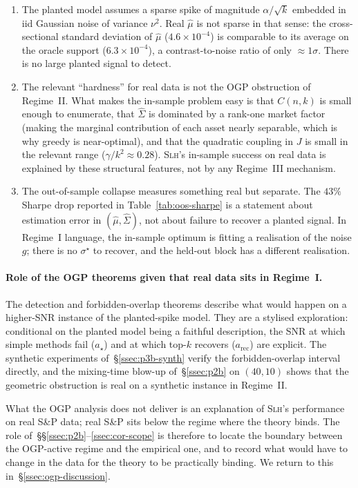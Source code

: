 \begin{enumerate}
  \item The planted model assumes a sparse spike of magnitude $\alpha/\sqrt{k}$
  embedded in iid Gaussian noise of variance $\nu^2$. Real $\hat\mu$ is not sparse in
  that sense: the cross-sectional standard deviation of $\hat\mu$
  ($4.6\times 10^{-4}$) is comparable to its average on the oracle support
  ($6.3\times 10^{-4}$), a contrast-to-noise ratio of only $\approx 1\sigma$. There is
  no large planted signal to detect.

  \item The relevant ``hardness'' for real data is not the OGP obstruction of
  Regime~II. What makes the in-sample problem easy is that $C(n,k)$ is small enough to
  enumerate, that $\hat\Sigma$ is dominated by a rank-one market factor (making the
  marginal contribution of each asset nearly separable, which is why greedy is
  near-optimal), and that the quadratic coupling in $J$ is small in the relevant range
  ($\gamma/k^2 \approx 0.28$). \textsc{Slh}'s in-sample success on real data is
  explained by these structural features, not by any Regime~III mechanism.

  \item The out-of-sample collapse measures something real but separate. The
  $43\%$ Sharpe drop reported in Table~\ref{tab:oos-sharpe} is a statement about
  estimation error in $(\hat\mu, \hat\Sigma)$, not about failure to recover a planted
  signal. In Regime~I language, the in-sample optimum is fitting a realisation of the
  noise $g$; there is no $\sigma^\star$ to recover, and the held-out block has a
  different realisation.
\end{enumerate}
 
\paragraph{Role of the OGP theorems given that real data sits in Regime~I.}
The detection and forbidden-overlap theorems describe what would happen on a
higher-SNR instance of the planted-spike model. They are a stylised exploration:
conditional on the planted model being a faithful description, the SNR at which simple
methods fail ($a_\star$) and at which top-$k$ recovers ($a_{\mathrm{rec}}$) are
explicit. The synthetic experiments of~\S\ref{ssec:p3b-synth} verify the
forbidden-overlap interval directly, and the mixing-time blow-up
of~\S\ref{ssec:p2b} on $(40,10)$ shows that the geometric obstruction is real on a
synthetic instance in Regime~II.

What the OGP analysis does not deliver is an explanation of \textsc{Slh}'s performance
on real S\&P data; real S\&P sits below the regime where the theory binds. The role
of~\S\S\ref{ssec:p2b}--\ref{ssec:cor-scope} is therefore to locate the boundary
between the OGP-active regime and the empirical one, and to record what would have to
change in the data for the theory to be practically binding. We return to this
in~\S\ref{ssec:ogp-discussion}.